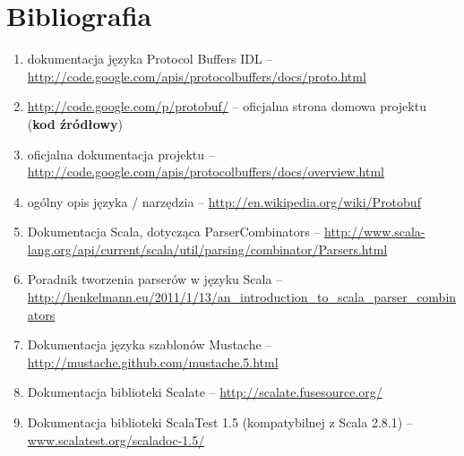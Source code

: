 \documentclass[a4paper]{article}
\begin{document}
\section{Bibliografia}
\begin{enumerate}
 \item dokumentacja języka Protocol Buffers IDL -- \url{http://code.google.com/apis/protocolbuffers/docs/proto.html}
 \item \url{http://code.google.com/p/protobuf/} -- oficjalna strona domowa projektu (\textbf{kod źródłowy})
 \item oficjalna dokumentacja projektu -- \url{http://code.google.com/apis/protocolbuffers/docs/overview.html}
 \item ogólny opis języka / narzędzia -- \url{http://en.wikipedia.org/wiki/Protobuf}
 \item Dokumentacja Scala, dotycząca ParserCombinators -- \url{http://www.scala-lang.org/api/current/scala/util/parsing/combinator/Parsers.html}
 \item Poradnik tworzenia parserów w języku Scala -- \url{http://henkelmann.eu/2011/1/13/an_introduction_to_scala_parser_combinators}
 \item Dokumentacja języka szablonów Mustache -- \url{http://mustache.github.com/mustache.5.html}
 \item Dokumentacja biblioteki Scalate -- \url{http://scalate.fusesource.org/}
 \item Dokumentacja biblioteki ScalaTest 1.5 (kompatybilnej z Scala 2.8.1) -- \url{www.scalatest.org/scaladoc-1.5/}
\end{enumerate}
\end{document}
